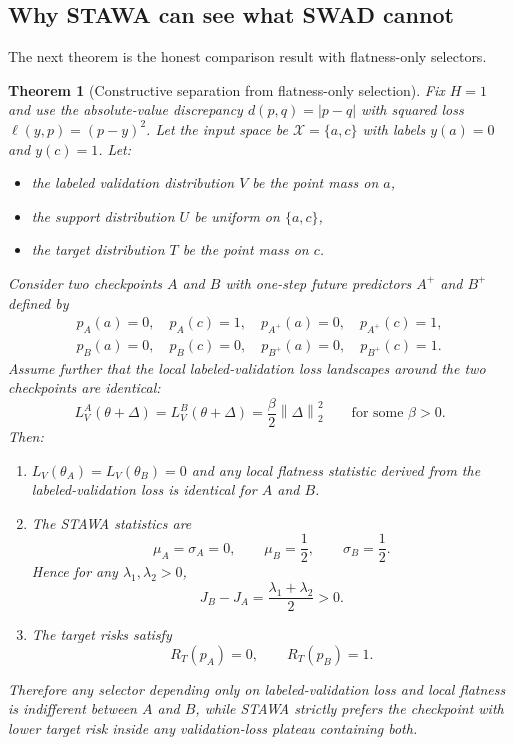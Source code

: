 \documentclass{article}
\newtheorem{theorem}{Theorem}
\newcommand{\stawa}{\textup{\textsc{STAWA}}}
\newcommand{\swad}{\textup{\textsc{SWAD}}}
\newcommand{\norm}[1]{\left\lVert #1 \right\rVert}
\begin{document}
\subsection{Why \stawa{} can see what \swad{} cannot}

The next theorem is the honest comparison result with flatness-only selectors.

\begin{theorem}[Constructive separation from flatness-only selection]
\label{thm:separation}
Fix $H=1$ and use the absolute-value discrepancy $d(p,q)=|p-q|$ with squared loss $\ell(y,p)=(p-y)^2$. Let the input space be $\mathcal{X}=\{a,c\}$ with labels $y(a)=0$ and $y(c)=1$. Let:
\begin{itemize}[leftmargin=1.4em]
    \item the labeled validation distribution $V$ be the point mass on $a$,
    \item the support distribution $U$ be uniform on $\{a,c\}$,
    \item the target distribution $T$ be the point mass on $c$.
\end{itemize}
Consider two checkpoints $A$ and $B$ with one-step future predictors $A^+$ and $B^+$ defined by
\begin{align}
    p_A(a)=0,\quad p_A(c)=1,\quad p_{A^+}(a)=0,\quad p_{A^+}(c)=1,\\
    p_B(a)=0,\quad p_B(c)=0,\quad p_{B^+}(a)=0,\quad p_{B^+}(c)=1.
\end{align}
Assume further that the local labeled-validation loss landscapes around the two checkpoints are identical:
\begin{equation}
    L_V^A(\theta+\Delta)
    =
    L_V^B(\theta+\Delta)
    =
    \frac{\beta}{2}\norm{\Delta}_2^2
    \qquad
    \text{for some } \beta>0.
\end{equation}
Then:
\begin{enumerate}[label=(\roman*), leftmargin=1.5em]
    \item $L_V(\theta_A)=L_V(\theta_B)=0$ and any local flatness statistic derived from the labeled-validation loss is identical for $A$ and $B$.
    \item The \stawa{} statistics are
    \begin{equation}
        \mu_A=\sigma_A=0,
        \qquad
        \mu_B=\frac{1}{2},
        \qquad
        \sigma_B=\frac{1}{2}.
    \end{equation}
    Hence for any $\lambda_1,\lambda_2>0$,
    \begin{equation}
        J_B - J_A = \frac{\lambda_1+\lambda_2}{2} > 0.
        \label{eq:score_gap}
    \end{equation}
    \item The target risks satisfy
    \begin{equation}
        R_T(p_A)=0,
        \qquad
        R_T(p_B)=1.
    \end{equation}
\end{enumerate}
Therefore any selector depending only on labeled-validation loss and local flatness is indifferent between $A$ and $B$, while \stawa{} strictly prefers the checkpoint with lower target risk inside any validation-loss plateau containing both.
\end{theorem}
\end{document}
